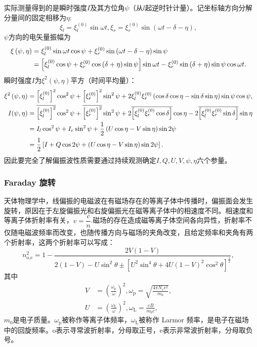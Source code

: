 \documentclass[../天体物理基础.tex]{subfiles}
\begin{document}
实际测量得到的是瞬时强度$I$及其方位角$\psi$（从$l$起逆时针计量）。记坐标轴方向分解分量间的固定相移为$\eta$:
\begin{equation}
\xi_l=\xi_l^{\left(0\right)}\sin\omega t,\xi_r=\xi_r^{\left(0\right)}\sin\left(\omega t-\delta-\eta\right),
\end{equation}
$\psi$方向的电矢量振幅为
\begin{align}
\xi\left(\psi,\eta\right)&=\xi_l^{\left(0\right)}\sin\omega t\cos\psi+\xi_r^{\left(0\right)}\sin\left(\omega t-\delta-\eta\right)\sin\psi\notag\\
&=\left[\xi_l^{\left(0\right)}\cos\psi+\xi_r^{\left(0\right)}\cos\left(\delta+\eta\right)\sin\psi\right]\sin\omega t-\xi_r^{\left(0\right)}\sin\left(\delta+\eta\right)\sin\psi\cos\omega t.
\end{align}
瞬时强度$I$为$\xi^{2}\left(\psi,\eta\right)$平方（时间平均量）：
\begin{align}
\xi^2\left(\psi,\eta\right)&=\left[\xi_l^{\left(0\right)}\right]^2\cos^2\psi+\left[\xi_r^{\left(0\right)}\right]^2\sin^2\psi+2\xi_l^{\left(0\right)}\xi_r^{\left(0\right)}\left(\cos\delta\cos\eta-\sin\delta\sin\eta\right)\sin\psi\cos\psi,\\
I(\psi,\eta)&=\overline{\left[\xi_l^{\left(0\right)}\right]^2}\cos^2\psi+\overline{\left[\xi_r^{\left(0\right)}\right]^2}\sin^2\psi+2\overline{\left[\xi_l^{\left(0\right)}\xi_r^{\left(0\right)}\cos\delta\right]}\cos\eta-2\overline{\left[\xi_l^{\left(0\right)}\xi_r^{\left(0\right)}\sin\delta\right]}\sin\eta\notag\\
&=I_l\cos^2\psi+I_r\sin^2\psi+\frac12\left(U\cos\eta-V\sin\eta\right)\sin2\psi\notag\\
&=\frac12\left[I+Q\cos2\psi+\left(U\cos\eta-V\sin\eta\right)\sin2\psi\right].
\end{align}
因此要完全了解偏振波性质需要通过持续观测确定$I,Q,U,V,\psi,\eta$六个参量。

\subsubsection{Faraday 旋转}
天体物理学中，线偏振的电磁波在有磁场存在的等离子体中传播时，偏振面会发生旋转，原因在于左旋偏振光和右旋偏振光在磁等离子体中的相速度不同。相速度和等离子体折射率有关，$v=\dfrac{c}{n}$.磁场的存在造成磁等离子体空间各向异性，折射率不仅随电磁波频率而改变，也随传播方向与磁场的夹角改变，且给定频率和夹角有两个折射率，这两个折射率可以写成：
\begin{equation}
n^{2}_{\text{o,e}}=1-\frac{2V\left(1-V\right)}{2\left(1-V\right)-U\sin^{2}\theta\pm\left[U^{2}\sin^{4}\theta+4U\left(1-V\right)^{2}\cos^{2}\theta\right]^{\frac{1}{2}}},
\end{equation}
其中
\begin{align}
V&=\left(\frac{\omega_{\text{p}}}{\omega}\right)^{2},\omega_{\text{p}}=\sqrt{\frac{4\pi N_{e}e^{2}}{m_{0}}},\\
U&=\left(\frac{\omega_{\text{L}}}{\omega}\right)^{2},\omega_{\text{L}}=\frac{eB}{m_{0}c},
\end{align}
$m_{0}$是电子质量。$\omega_{\text{p}}$被称作等离子体频率，$\omega_{\text{L}}$被称作 Larmor 频率，是电子在磁场中的回旋频率。$\text{o}$表示寻常波折射率，分母取正号，$\text{e}$表示非常波折射率，分母取负号。
\end{document}
